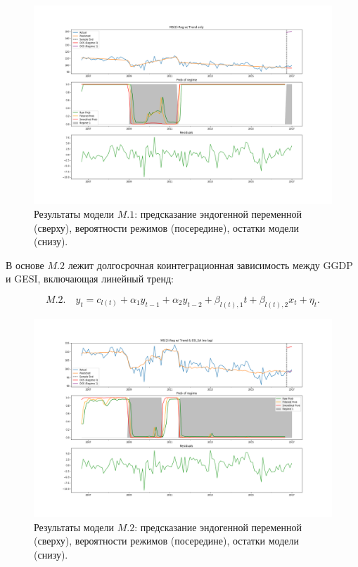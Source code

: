 \documentclass[a4paper,14pt]{extreport}
\begin{document}
\begin{figure}[H]
	\includegraphics[width=\linewidth]{img/manual/model_m1.png}
	\caption{
		Результаты модели $M.1$: предсказание эндогенной переменной (сверху), вероятности режимов (посередине), остатки модели (снизу).
	}
	\label{fig:sm_model_m1}
\end{figure}

В основе $M.2$ лежит долгосрочная коинтеграционная зависимость между GGDP и GESI, включающая линейный тренд:

\begin{equation}
	M.2. \quad y_t = c_{l(t)} + \alpha_1 y_{t-1} + \alpha_2 y_{t-2} + \beta_{l(t), 1} t + \beta_{l(t), 2} x_{t} + \eta_t .
\end{equation}

\begin{figure}[H]
	\includegraphics[width=\linewidth]{img/manual/model_m2.png}
	\caption{
		Результаты модели $M.2$: предсказание эндогенной переменной (сверху), вероятности режимов (посередине), остатки модели (снизу).
	}
	\label{fig:sm_model_m2}
\end{figure}
\end{document}
